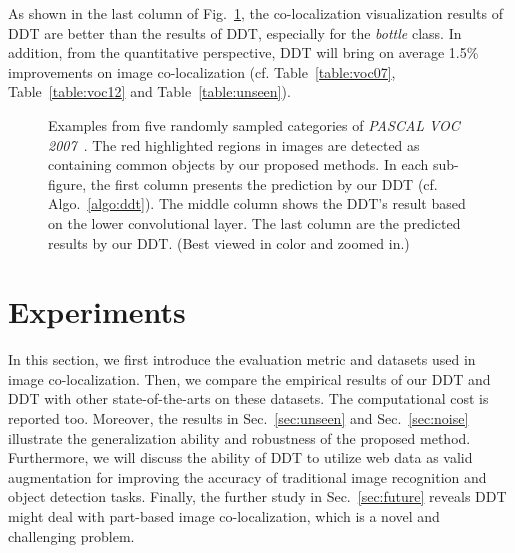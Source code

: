 \documentclass[twocolumn]{svjour3}          \smartqed  \usepackage{graphicx}
\begin{document}
As shown in the last column of Fig.~\ref{fig:ddtp}, the co-localization visualization results of DDT are better than the results of DDT, especially for the \emph{bottle} class. In addition, from the quantitative perspective, DDT will bring on average 1.5\% improvements on image co-localization (cf. Table~\ref{table:voc07}, Table~\ref{table:voc12} and Table~\ref{table:unseen}).

\begin{figure}[t]
 \centering




 \caption{Examples from five randomly sampled categories of \emph{PASCAL VOC 2007}~\citep{voc2015}. The red highlighted regions in images are  detected as containing common objects by our proposed methods. In each sub-figure, the first column presents the prediction by our DDT (cf. Algo.~\ref{algo:ddt}). The middle column shows the DDT's result based on the lower convolutional layer. The last column are the predicted results by our DDT. (Best viewed in color and zoomed in.)} \label{fig:ddtp}
\end{figure}

\section{Experiments}\label{sec:experi}

In this section, we first introduce the evaluation metric and datasets used in image co-localization. Then, we compare the empirical results of our DDT and DDT with other state-of-the-arts on these datasets. The computational cost is reported too. Moreover, the results in Sec.~\ref{sec:unseen} and Sec.~\ref{sec:noise} illustrate the generalization ability and robustness of the proposed method. Furthermore, we will discuss the ability of DDT to utilize web data as valid augmentation for improving the accuracy of traditional image recognition and object detection tasks. Finally, the further study in Sec.~\ref{sec:future} reveals DDT might deal with part-based image co-localization, which is a novel and challenging problem.
\end{document}
